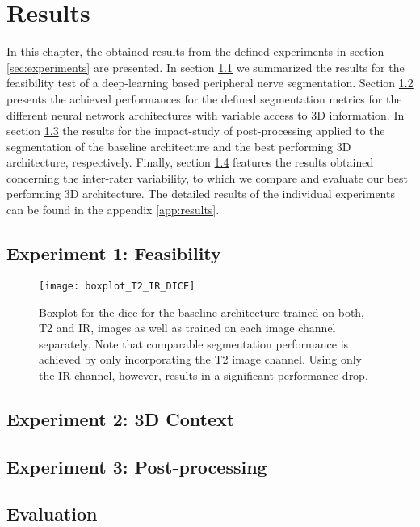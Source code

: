 \chapter{Results}
In this chapter, the obtained results from the defined experiments in section \ref{sec:experiments} are presented. In section \ref{sec:exp_feas} we summarized the results for the feasibility test of a deep-learning based peripheral nerve segmentation.
Section \ref{sec:exp_3dcontext} presents the achieved performances for the defined segmentation metrics for the different neural network architectures with variable access to 3D information.
In section \ref{sec:exp_pp} the results for the impact-study of post-processing applied to the segmentation of the baseline architecture and the best performing 3D architecture, respectively.
Finally, section \ref{sec:exp_evaluation} features the results obtained concerning the inter-rater variability, to which we compare and evaluate our best performing 3D architecture.
The detailed results of the individual experiments can be found in the appendix \ref{app:results}.
\section{Experiment 1: Feasibility} \label{sec:exp_feas}

\begin{figure}[htbp]
	\centering
	\texttt{[image: boxplot\_T2\_IR\_DICE]}
    \caption[Boxplot for the \acrlong{dice} for the Baseline trained on T2 and IR separately.]{Boxplot for the \acrlong{dice} for the baseline architecture trained on both, T2 and IR, images as well as trained on each image channel separately. Note that comparable segmentation performance is achieved by only incorporating the T2 image channel. Using only the IR channel, however, results in a significant performance drop.}
    \label{fig:results_boxplot_T2_IR_dice}
\end{figure}




\section{Experiment 2: 3D Context} \label{sec:exp_3dcontext}
\section{Experiment 3: Post-processing} \label{sec:exp_pp}
\section{Evaluation} \label{sec:exp_evaluation}
\endinput